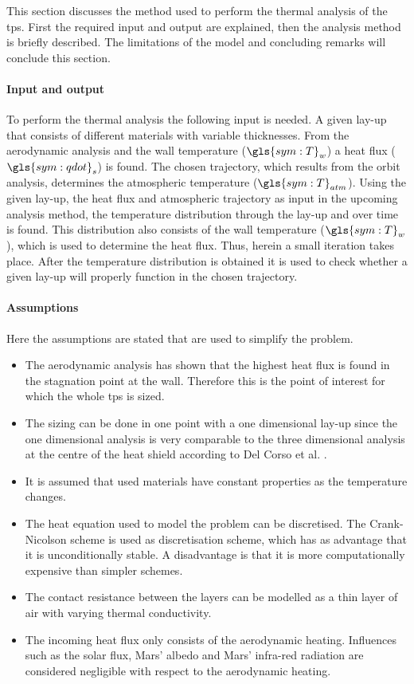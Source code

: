 This section discusses the method used to perform the thermal analysis of the \gls{tps}. First the required input and output are explained, then the analysis method is briefly described. The limitations of the model and concluding remarks will conclude this section.

\paragraph{Input and output}
To perform the thermal analysis the following input is needed. A given lay-up that consists of different materials with variable thicknesses. From the aerodynamic analysis and the wall temperature ($\gls{sym:T}_w$) a heat flux ($\gls{sym:qdot}_s$) is found. The chosen trajectory, which results from the orbit analysis, determines the atmospheric temperature ($\gls{sym:T}_{atm}$). Using the given lay-up, the heat flux and atmospheric trajectory as input in the upcoming analysis method, the temperature distribution through the lay-up and over time is found. This distribution also consists of the wall temperature ($\gls{sym:T}_w$), which is used to determine the heat flux. Thus, herein a small iteration takes place. After the temperature distribution is obtained it is used to check whether a given lay-up will properly function in the chosen trajectory.

\paragraph{Assumptions}
Here the assumptions are stated that are used to simplify the problem.
\begin{itemize}
	\item The aerodynamic analysis has shown that the highest heat flux is found in the stagnation point at the wall. Therefore this is the point of interest for which the whole \gls{tps} is sized.
	\item The sizing can be done in one point with a one dimensional lay-up since the one dimensional analysis is very comparable to the three dimensional analysis at the centre of the heat shield according to Del Corso et al. \cite{Corso2009}.
	\item It is assumed that used materials have constant properties as the temperature changes. 
	\item The heat equation used to model the problem can be discretised. The Crank-Nicolson scheme is used as discretisation scheme, which has as advantage that it is unconditionally stable. A disadvantage is that it is more computationally expensive than simpler schemes.
	\item The contact resistance between the layers can be modelled as a thin layer of air with varying thermal conductivity.
	\item The incoming heat flux only consists of the aerodynamic heating. Influences such as the solar flux, Mars' albedo and Mars' infra-red radiation are considered negligible with respect to the aerodynamic heating.
\end{itemize}


